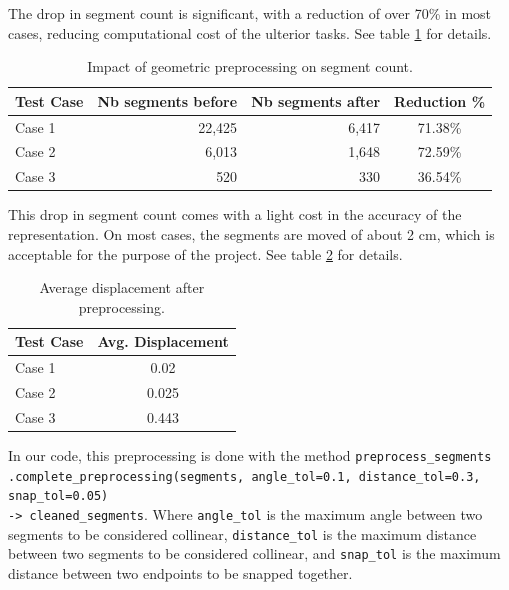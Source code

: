 \documentclass[11pt]{article}
\begin{document}
The drop in segment count is significant, with a reduction of over 70\% in most cases, 
reducing computational cost of the ulterior tasks. See table \ref{tab:segment_count} for details.

\begin{table}[htb!]
    \centering
    \begin{tabular}{|l|rrc|}
        \hline
        \textbf{Test Case} & \textbf{Nb segments before} & \textbf{Nb segments after} & \textbf{Reduction \%} \\
        \hline

        Case 1 & 22,425 & 6,417 & 71.38\% \\
        Case 2 & 6,013 & 1,648 & 72.59\% \\
        Case 3 & 520 & 330 & 36.54\% \\
        \hline
    \end{tabular}
    \caption{Impact of geometric preprocessing on segment count.}
    \label{tab:segment_count}
\end{table}

This drop in segment count comes with a light cost in the accuracy of the representation.
On most cases, the segments are moved of about 2 cm, which is acceptable for the
purpose of the project. See table \ref{tab:avg_displacement} for details.

\begin{table}[htb!]
    \centering
    \begin{tabular}{|l|c|}
        \hline

        \textbf{Test Case} & \textbf{Avg. Displacement} \\
        \hline
        Case 1 & 0.02 \\
        Case 2 & 0.025 \\
        Case 3 & 0.443 \\
        \hline

    \end{tabular}
    \caption{Average displacement after preprocessing.}
    \label{tab:avg_displacement}
\end{table}

In our code, this preprocessing is done with the method 
\texttt{preprocess\_segments\\.complete\_preprocessing(segments, angle\_tol=0.1, distance\_tol=0.3, snap\_tol=0.05)\\ -> cleaned\_segments}. 
    Where \texttt{angle\_tol} is the maximum angle between two segments to be considered collinear,
    \texttt{distance\_tol} is the maximum distance between two segments to be considered collinear,
    and \texttt{snap\_tol} is the maximum distance between two endpoints to be snapped together.
\end{document}
